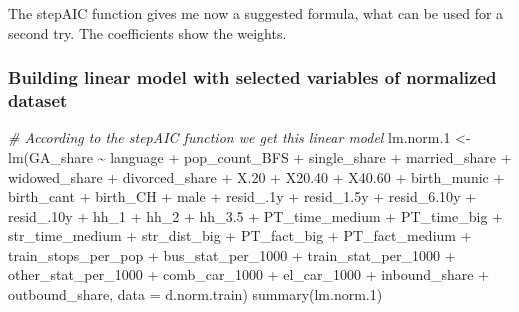 \documentclass[
]{article}
\newenvironment{Shaded}{\begin{snugshade}}{\end{snugshade}}
\newcommand{\AttributeTok}[1]{\textcolor[rgb]{0.77,0.63,0.00}{#1}}
\newcommand{\CommentTok}[1]{\textcolor[rgb]{0.56,0.35,0.01}{\textit{#1}}}
\newcommand{\FloatTok}[1]{\textcolor[rgb]{0.00,0.00,0.81}{#1}}
\newcommand{\FunctionTok}[1]{\textcolor[rgb]{0.00,0.00,0.00}{#1}}
\newcommand{\NormalTok}[1]{#1}
\newcommand{\OtherTok}[1]{\textcolor[rgb]{0.56,0.35,0.01}{#1}}
\newcommand{\SpecialCharTok}[1]{\textcolor[rgb]{0.00,0.00,0.00}{#1}}
\begin{document}
The stepAIC function gives me now a suggested formula, what can be used
for a second try. The coefficients show the weights.

\hypertarget{building-linear-model-with-selected-variables-of-normalized-dataset}{%
\subsubsection{Building linear model with selected variables of
normalized
dataset}\label{building-linear-model-with-selected-variables-of-normalized-dataset}}

\begin{Shaded}
\begin{Highlighting}[]
\CommentTok{\# According to the stepAIC function we get this linear model}
\NormalTok{lm.norm}\FloatTok{.1} \OtherTok{\textless{}{-}} \FunctionTok{lm}\NormalTok{(GA\_share }\SpecialCharTok{\textasciitilde{}}\NormalTok{ language }\SpecialCharTok{+}\NormalTok{ pop\_count\_BFS }\SpecialCharTok{+}\NormalTok{ single\_share }\SpecialCharTok{+} 
\NormalTok{    married\_share }\SpecialCharTok{+}\NormalTok{ widowed\_share }\SpecialCharTok{+}\NormalTok{ divorced\_share }\SpecialCharTok{+}\NormalTok{ X}\FloatTok{.20} \SpecialCharTok{+}\NormalTok{ X20}\FloatTok{.40} \SpecialCharTok{+} 
\NormalTok{    X40}\FloatTok{.60} \SpecialCharTok{+}\NormalTok{ birth\_munic }\SpecialCharTok{+}\NormalTok{ birth\_cant }\SpecialCharTok{+}\NormalTok{ birth\_CH }\SpecialCharTok{+}\NormalTok{ male }\SpecialCharTok{+}\NormalTok{ resid\_}\FloatTok{.1}\NormalTok{y }\SpecialCharTok{+} 
\NormalTok{    resid\_1}\FloatTok{.5}\NormalTok{y }\SpecialCharTok{+}\NormalTok{ resid\_6}\FloatTok{.10}\NormalTok{y }\SpecialCharTok{+}\NormalTok{ resid\_}\FloatTok{.10}\NormalTok{y }\SpecialCharTok{+}\NormalTok{ hh\_1 }\SpecialCharTok{+}\NormalTok{ hh\_2 }\SpecialCharTok{+}\NormalTok{ hh\_3}\FloatTok{.5} \SpecialCharTok{+} 
\NormalTok{    PT\_time\_medium }\SpecialCharTok{+}\NormalTok{ PT\_time\_big }\SpecialCharTok{+}\NormalTok{ str\_time\_medium }\SpecialCharTok{+}\NormalTok{ str\_dist\_big }\SpecialCharTok{+} 
\NormalTok{    PT\_fact\_big }\SpecialCharTok{+}\NormalTok{ PT\_fact\_medium }\SpecialCharTok{+}\NormalTok{ train\_stops\_per\_pop }\SpecialCharTok{+}\NormalTok{ bus\_stat\_per\_1000 }\SpecialCharTok{+} 
\NormalTok{    train\_stat\_per\_1000 }\SpecialCharTok{+}\NormalTok{ other\_stat\_per\_1000 }\SpecialCharTok{+}\NormalTok{ comb\_car\_1000 }\SpecialCharTok{+} 
\NormalTok{    el\_car\_1000 }\SpecialCharTok{+}\NormalTok{ inbound\_share }\SpecialCharTok{+}\NormalTok{ outbound\_share, }\AttributeTok{data =}\NormalTok{ d.norm.train) }
\FunctionTok{summary}\NormalTok{(lm.norm}\FloatTok{.1}\NormalTok{)}
\end{Highlighting}
\end{Shaded}
\end{document}
